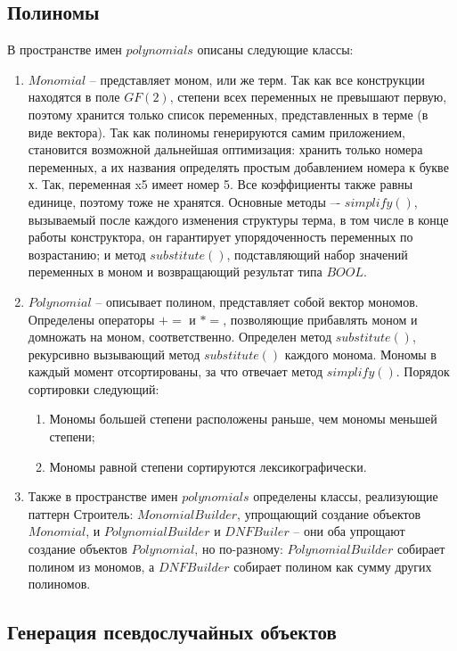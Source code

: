 \subsection{Полиномы} \label{ch2:subsec-title-abbr} %

В пространстве имен \(polynomials\) описаны следующие классы:
\begin{enumerate}
	\item \(Monomial\) -- представляет моном, или же терм. Так как все конструкции находятся в поле \(GF(2)\), степени всех переменных не превышают первую, поэтому хранится только список переменных, представленных в терме (в виде вектора). Так как полиномы генерируются самим приложением, становится возможной дальнейшая оптимизация: хранить только номера переменных, а их названия определять простым добавлением номера к букве х. Так, переменная x5 имеет номер 5. Все коэффициенты также равны единице, поэтому тоже не хранятся. Основные методы –- \(simplify()\), вызываемый после каждого изменения структуры терма, в том числе в конце работы конструктора, он гарантирует упорядоченность переменных по возрастанию; и метод \(substitute()\), подставляющий набор значений переменных в моном и возвращающий результат типа \(BOOL\).
	\item \(Polynomial\) -- описывает полином, представляет собой вектор мономов. Определены операторы \(+=\) и \(*=\), позволяющие прибавлять моном и домножать на моном, соответственно. Определен метод \(substitute()\), рекурсивно вызывающий метод \(substitute()\) каждого монома. Мономы в каждый момент отсортированы, за что отвечает метод \(simplify()\). Порядок сортировки следующий:
	\begin{enumerate}
		\item Мономы большей степени расположены раньше, чем мономы меньшей степени;
		\item Мономы равной степени сортируются лексикографически.
	\end{enumerate} 
	\item Также в пространстве имен \(polynomials\) определены классы, реализующие паттерн Строитель: \(MonomialBuilder\), упрощающий создание объектов \(Monomial\), и \(PolynomialBuilder\) и \(DNFBuiler\) – они оба упрощают создание объектов \(Polynomial\), но по-разному: \(PolynomialBuilder\) собирает полином из мономов, а \(DNFBuilder\) собирает полином как сумму других полиномов.
\end{enumerate} 


\subsection{Генерация псевдослучайных объектов} \label{ch2:subsec-title-abbr} %

